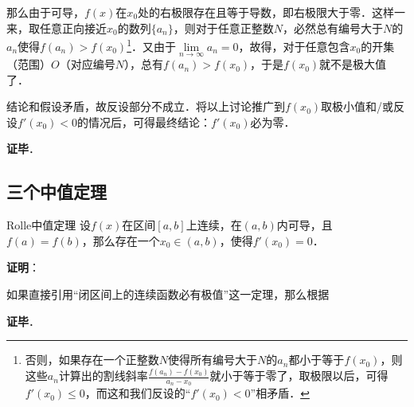 那么由于可导，$f(x)$在$x_0$处的右极限存在且等于导数，即右极限大于零．这样一来，取任意正向接近$x_0$的数列$\{a_n\}$，则对于任意正整数$N$，必然总有编号大于$N$的$a_n$使得$f(a_n)>f(x_0)$\footnote{否则，如果存在一个正整数$N$使得所有编号大于$N$的$a_n$都小于等于$f(x_0)$，则这些$a_n$计算出的割线斜率$\frac{f(a_n)-f(x_0)}{a_n-x_0}$就小于等于零了，取极限以后，可得$f'(x_0)\leq 0$，而这和我们反设的“$f'(x_0)<0$”相矛盾．}．又由于$\lim\limits_{n\to\infty}a_n=0$，故得，对于任意包含$x_0$的开集（范围）$O$（对应编号$N$），总有$f(a_n)>f(x_0)$，于是$f(x_0)$就不是极大值了．

结论和假设矛盾，故反设部分不成立．将以上讨论推广到$f(x_0)$取极小值和/或反设$f'(x_0)<0$的情况后，可得最终结论：$f'(x_0)$必为零．

\textbf{证毕}．




\subsection{三个中值定理}


\begin{definition}{Rolle中值定理}
设$f(x)$在区间$[a, b]$上连续，在$(a, b)$内可导，且$f(a)=f(b)$，那么存在一个$x_0\in(a, b)$，使得$f'(x_0)=0$．
\end{definition}


\textbf{证明}：

如果直接引用“闭区间上的连续函数必有极值”这一定理，那么根据

\textbf{证毕}．














